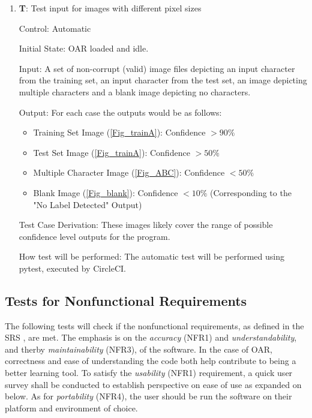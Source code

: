 \documentclass[12pt, titlepage]{article}
\newcounter{testnum} %
\begin{document}
\begin{enumerate}

  \item{\textbf{T\thetestnum \label{T_outputConf}}: Test input for images with different pixel sizes\\}
            
  Control: Automatic
            
  Initial State: OAR loaded and idle.
            
  Input: A set of non-corrupt (valid) image files depicting an input character from the training set, an input character from the test set,
  an image depicting multiple characters and a blank image depicting no characters.
            
  Output: For each case the outputs would be as follows:
  \begin{itemize}
    \item{Training Set Image (\ref{Fig_trainA}): Confidence $> 90\%$}
    \item{Test Set Image (\ref{Fig_trainA}): Confidence $> 50\%$}
    \item{Multiple Character Image (\ref{Fig_ABC}): Confidence $< 50\%$}
    \item{Blank Image (\ref{Fig_blank}): Confidence $< 10\%$ (Corresponding to the "No Label Detected" Output)}
  \end{itemize}
 
  Test Case Derivation: These images likely cover the range of possible confidence level outputs for the program.
            
  How test will be performed: The automatic test will be performed using pytest, executed by CircleCI.
\end{enumerate}


\subsection{Tests for Nonfunctional Requirements}

The following tests will check if the nonfunctional requirements, as defined in the SRS \citep{SRS}, are 
met. The emphasis is on the \textit{accuracy} (NFR1) and \textit{understandability}, and 
therby \textit{maintainability} (NFR3), of the software. In the case of OAR, 
correctness and ease of understanding the code both help contribute to being a better learning tool.
To satisfy the \textit{usability} (NFR1) requirement, a quick user survey shall be
conducted to establish perspective on ease of use as expanded on below. As for \textit{portability} (NFR4),
the user should be run the software on their platform and environment of choice.
\end{document}

